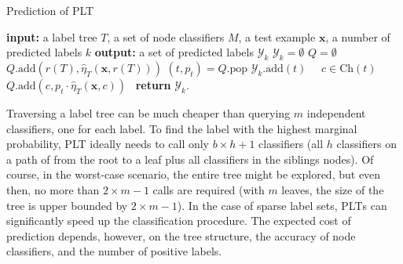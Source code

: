 \documentclass{article}
\newcommand{\Algo}[1]{\textsc{#1}}
\renewcommand{\vec}[1]{\boldsymbol{#1}}
\newcommand{\bx}{\vec{x}}
\newcommand{\by}{\vec{y}}
\newcommand{\calY}{\mathcal{Y}}
\newcommand{\heta}{\hat{\eta}}
\newcommand{\Children}[1]{\mathrm{Ch}(#1)}
\begin{document}
{%

\begin{algorithm}[t]
\caption{Prediction of \Algo{PLT}} %
\label{alg:pt-prediction}
\begin{algorithmic}[1]
\State \textbf{input:} a label tree $T$,  a set of node classifiers $M$, a test example $\bx$, a number of predicted labels $k$ 
\State \textbf{output:} a set of predicted labels $\calY_k$ 
\State $\calY_k = \emptyset$
\State $Q = \emptyset$ 
\State $Q.\mathrm{add}(r(T),\heta_T(\bx,r(T)))$ 
\While{$|\calY_k| < k$}
\State $(t,p_t) = Q.\mathrm{pop}$
 $\calY_k.\mathrm{add}(t)$ 
\Else \ \algorithmicfor\ $c \in \Children{t}$\ \algorithmicdo\ $Q.\mathrm{add}(c, p_t \cdot \heta_T(\bx,c))$\ 
\EndIf
\EndWhile
\State \textbf{return} $\calY_k$. 
\end{algorithmic}
\end{algorithm} 

Traversing a label tree can be much cheaper than querying $m$ independent classifiers, one for each label. To find the label with the highest marginal probability, \Algo{PLT} ideally needs to call only $b\times h+1$ classifiers (all $h$ classifiers on a path of from the root to a leaf plus all classifiers in the siblings nodes). Of course, in the worst-case scenario, the entire tree might be explored, but even then, no more than $2 \times m-1$ calls are required (with $m$ leaves, the size of the tree is upper bounded by $2 \times m-1$). In the case of sparse label sets, \Algo{PLT}s can significantly speed up the classification procedure. The expected cost of prediction depends, however, on the tree structure, the accuracy of node classifiers, and the number of positive labels.

}
\end{document}
